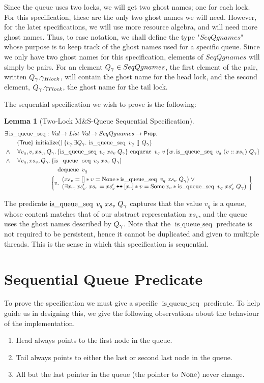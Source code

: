 \documentclass[a4paper, 11pt]{report}
\newtheorem{lemma}[theorem]{Lemma}
\newcommand{\initialise}{\operatorname{initialize}}
\newcommand{\enqueue}{\operatorname{enqueue}}
\newcommand{\dequeue}{\operatorname{dequeue}}
\newcommand{\isqueueseq}{\operatorname{is\_queue\_seq}}
\newcommand\catenate{\mathbin{\text{\ttfamily\upshape ++}}}
\newcommand{\tlseqspecinit}{\hoare{\TRUE}{\initialise \TT}{v_q . \Exists Q_\gname. \isqueueseq\ v_q\ []\ Q_\gname}}
\newcommand{\tlseqspecenq}{\All v_q, v, xs_v, Q_\gname. \hoare{\isqueueseq \; v_q \; xs_v \; Q_\gname}{\enqueue\ v_q\ v}{w . \isqueueseq\ v_q\ (v :: xs_v)\ Q_\gname}}
\newcommand{\tlseqspecdeq}{\All v_q, xs_v, Q_\gname. \hoareV[t]{\isqueueseq \; v_q \; xs_v \; Q_\gname}{\dequeue\ v_q}{v . \begin{array}{l}(xs_v = [] \star v = \None \star \isqueueseq\ v_q\ xs_v\ Q_\gname) \; \lor\\ (\Exists x_v, xs_v' . xs_v = xs_v' \catenate [x_v] \star v = \Some x_v \star \isqueueseq\ v_q\ xs_v'\ Q_\gname) \end{array}}}
\begin{document}
Since the queue uses two locks, we will get two ghost names; one for each lock. For this specification, these are the only two ghost names we will need. However, for the later specifications, we will use more resource algebra, and will need more ghost names. Thus, to ease notation, we shall define the type "$SeqQgnames$" whose purpose is to keep track of the ghost names used for a specific queue. Since we only have two ghost names for this specification, elements of $SeqQgnames$ will simply be pairs. For an element $Q_\gamma \in SeqQgnames$, the first element of the pair, written $Q_\gamma.\gamma_{Hlock}$, will contain the ghost name for the head lock, and the second element, $Q_\gamma.\gamma_{Tlock}$, the ghost name for the tail lock.

The sequential specification we wish to prove is the following:
\begin{lemma}[Two-Lock M\&S-Queue Sequential Specification]\label{TLMSQ:spec:seq}
\begin{align*}
  &\Exists \isqueueseq : \Val \to \List \ \Val \to SeqQgnames \to \Prop.\\
  &\quad\quad\tlseqspecinit\\
  &\land\quad\tlseqspecenq\\
  &\land\quad\tlseqspecdeq
\end{align*}
\end{lemma}

The predicate $\isqueueseq \; v_q \; xs_v \; Q_\gname$ captures that the value $v_q$ is a queue, whose content matches that of our abstract representation $xs_v$, and the queue uses the ghost names described by $Q_\gamma$. Note that the $\isqueueseq$ predicate is not required to be persistent, hence it cannot be duplicated and given to multiple threads. This is the sense in which this specification is sequential.

\section{Sequential Queue Predicate}
\label{TLMSQSEQ:section:seq-queue-pred}

To prove the specification we must give a specific $\isqueueseq$ predicate. To help guide us in designing this, we give the following observations about the behaviour of the implementation.
\begin{enumerate}
  \item\label{TLMSQ:insights:head} Head always points to the first node in the queue.
  \item\label{TLMSQ:insights:tail} Tail always points to either the last or second last node in the queue.
  \item\label{TLMSQ:insights:persistent} All but the last pointer in the queue (the pointer to $\operatorname{None}$) never change.
\end{enumerate}
\end{document}
